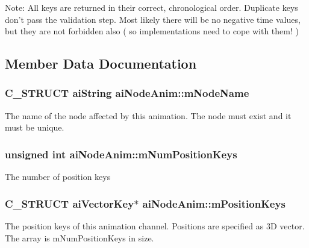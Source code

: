 \begin{Desc}
\item[Note:]All keys are returned in their correct, chronological order. Duplicate keys don't pass the validation step. Most likely there will be no negative time values, but they are not forbidden also ( so implementations need to cope with them! ) \end{Desc}


\subsection{Member Data Documentation}
\hypertarget{structai_node_anim_22a591381e75214ba03c6aaa770638f3}{
\subsubsection[mNodeName]{\setlength{\rightskip}{0pt plus 5cm}C\_\-STRUCT {\bf aiString} {\bf aiNodeAnim::mNodeName}}}
\label{structai_node_anim_22a591381e75214ba03c6aaa770638f3}


The name of the node affected by this animation. The node must exist and it must be unique. \hypertarget{structai_node_anim_ab725313d31db70adab778a3c125103f}{
\subsubsection[mNumPositionKeys]{\setlength{\rightskip}{0pt plus 5cm}unsigned int {\bf aiNodeAnim::mNumPositionKeys}}}
\label{structai_node_anim_ab725313d31db70adab778a3c125103f}


The number of position keys \hypertarget{structai_node_anim_983d0db426ac7e5fce442beb19552db3}{
\subsubsection[mPositionKeys]{\setlength{\rightskip}{0pt plus 5cm}C\_\-STRUCT {\bf aiVectorKey}$\ast$ {\bf aiNodeAnim::mPositionKeys}}}
\label{structai_node_anim_983d0db426ac7e5fce442beb19552db3}


The position keys of this animation channel. Positions are specified as 3D vector. The array is mNumPositionKeys in size.

